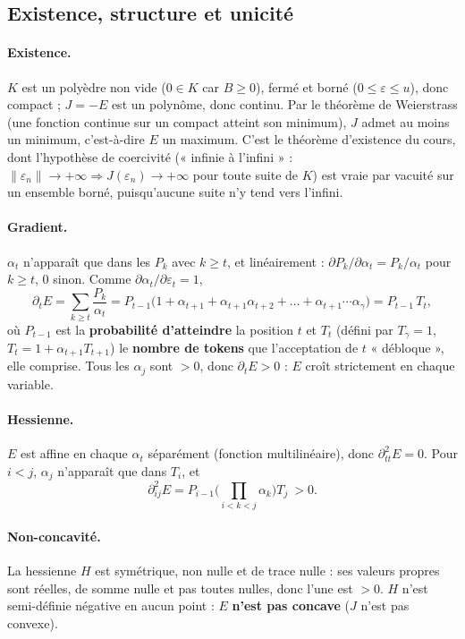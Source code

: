 \documentclass[11pt,a4paper]{article}
\newcommand{\nr}[1]{\|#1\|}
\theoremstyle{plain}
\theoremstyle{definition}
\begin{document}
\subsection{Existence, structure et unicité}\label{sec:existenceII}
\paragraph{Existence.} $K$ est un polyèdre non vide ($0\in K$ car $B\ge0$), fermé et borné ($0\le\varepsilon\le u$), donc compact ; $J=-E$ est un polynôme, donc continu. Par le théorème de Weierstrass (une fonction continue sur un compact atteint son minimum), $J$ admet au moins un minimum, c'est-à-dire $E$ un maximum. C'est le théorème d'existence du cours, dont l'hypothèse de coercivité (« infinie à l'infini » : $\nr{\varepsilon_n}\to+\infty\Rightarrow J(\varepsilon_n)\to+\infty$ pour toute suite de $K$) est vraie par vacuité sur un ensemble borné, puisqu'aucune suite n'y tend vers l'infini.

\paragraph{Gradient.} $\alpha_t$ n'apparaît que dans les $P_k$ avec $k\ge t$, et linéairement : $\partial P_k/\partial\alpha_t=P_k/\alpha_t$ pour $k\ge t$, $0$ sinon. Comme $\partial\alpha_t/\partial\varepsilon_t=1$,
\[\partial_tE=\sum_{k\ge t}\frac{P_k}{\alpha_t}=P_{t-1}\big(1+\alpha_{t+1}+\alpha_{t+1}\alpha_{t+2}+\dots+\alpha_{t+1}\cdots\alpha_\gamma\big)=P_{t-1}\,T_t,\]
où $P_{t-1}$ est la \textbf{probabilité d'atteindre} la position $t$ et $T_t$ (défini par $T_\gamma=1$, $T_t=1+\alpha_{t+1}T_{t+1}$) le \textbf{nombre de tokens} que l'acceptation de $t$ « débloque », elle comprise. Tous les $\alpha_j$ sont $>0$, donc $\partial_tE>0$ : $E$ croît strictement en chaque variable.

\paragraph{Hessienne.} $E$ est affine en chaque $\alpha_t$ séparément (fonction multilinéaire), donc $\partial^2_{tt}E=0$. Pour $i<j$, $\alpha_j$ n'apparaît que dans $T_i$, et
\[\partial^2_{ij}E=P_{i-1}\Big(\prod_{i<k<j}\alpha_k\Big)T_j\ >0.\]

\paragraph{Non-concavité.} La hessienne $H$ est symétrique, non nulle et de trace nulle : ses valeurs propres sont réelles, de somme nulle et pas toutes nulles, donc l'une est $>0$. $H$ n'est semi-définie négative en aucun point : $E$ \textbf{n'est pas concave} ($J$ n'est pas convexe).
\end{document}
